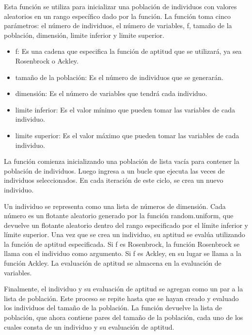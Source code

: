 \documentclass{report}
\begin{document}
    Esta función se utiliza para inicializar una población de individuos 
    con valores aleatorios en un rango específico dado por la función. La función toma cinco parámetros: el número de individuos, el número de variables,
    f, tamaño de la población, dimensión, limite inferior y limite superior.
    
    \begin{itemize}
        \item f: Es una cadena que especifica la función de aptitud que se utilizará, ya sea Rosenbrock o Ackley.
        \item tamaño de la población: Es el número de individuos que se generarán.
        \item dimensión: Es el número de variables que tendrá cada individuo.
        \item limite inferior: Es el valor mínimo que pueden tomar las variables de cada individuo.
        \item limite superior: Es el valor máximo que pueden tomar las variables de cada individuo.
    \end{itemize}
    
    La función comienza inicializando una población de lista vacía para contener la población de individuos. Luego ingresa a un bucle que ejecuta las veces de individuos seleccionados. En cada iteración de este ciclo, se crea un nuevo individuo.

    Un individuo se representa como una lista de números de dimensión. Cada número es un flotante aleatorio generado por la función random.uniform, que devuelve un flotante aleatorio dentro del rango especificado por el límite inferior y límite superior.
    Una vez que se crea un individuo, su aptitud se evalúa utilizando la función de aptitud especificada. Si f es Rosenbrock, la función Rosenbrock se llama con el individuo como argumento. Si f es Ackley, en su lugar se llama a la función Ackley. La evaluación de aptitud se almacena en la evaluación de variables.

    Finalmente, el individuo y su evaluación de aptitud se agregan como un par a la lista de población. Este proceso se repite hasta que se hayan creado y evaluado los individuos del tamaño de la población.
    La función devuelve la lista de población, que ahora contiene pares del tamaño de la población, cada uno de los cuales consta de un individuo y su evaluación de aptitud.
\end{document}
